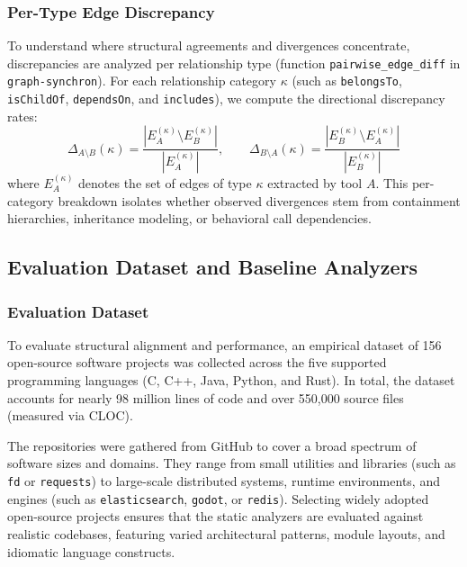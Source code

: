 \subsubsection{Per-Type Edge Discrepancy}
\label{subsec:categorical_discordance}

To understand where structural agreements and divergences
concentrate, discrepancies are analyzed per relationship type
(function \texttt{pairwise\_edge\_diff} in
\texttt{graph-synchron}). For each relationship category $\kappa$
(such as \texttt{belongsTo}, \texttt{isChildOf}, \texttt{dependsOn},
and \texttt{includes}), we compute the directional discrepancy rates:
\begin{equation}
  \Delta_{A \setminus B}(\kappa) = \frac{|E_A^{(\kappa)} \setminus
  E_B^{(\kappa)}|}{|E_A^{(\kappa)}|}, \qquad
  \Delta_{B \setminus A}(\kappa) = \frac{|E_B^{(\kappa)} \setminus
  E_A^{(\kappa)}|}{|E_B^{(\kappa)}|}
\end{equation}
where $E_A^{(\kappa)}$ denotes the set of edges of type $\kappa$
extracted by tool $A$. This per-category breakdown isolates whether
observed divergences stem from containment hierarchies, inheritance
modeling, or behavioral call dependencies.

\subsection{Evaluation Dataset and Baseline Analyzers}
\label{subsec:dataset_and_baselines}

\subsubsection{Evaluation Dataset}
\label{subsec:dataset_selection}

To evaluate structural alignment and performance, an empirical
dataset of 156 open-source software projects was collected across the
five supported programming languages (C, C++, Java, Python, and
Rust). In total, the dataset accounts for nearly 98 million lines of
code and over 550,000 source files (measured via CLOC).

The repositories were gathered from GitHub to cover a broad spectrum
of software sizes and domains. They range from small utilities and
libraries (such as \texttt{fd} or \texttt{requests}) to large-scale
distributed systems, runtime environments, and engines (such as
\texttt{elasticsearch}, \texttt{godot}, or \texttt{redis}). Selecting
widely adopted open-source projects ensures that the static analyzers
are evaluated against realistic codebases, featuring varied
architectural patterns, module layouts, and idiomatic language constructs.

